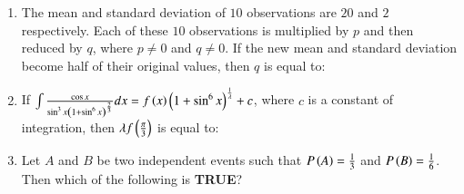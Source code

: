 \documentclass[journal,12pt,onecolumn]{IEEEtran}
\theoremstyle{remark}
\begin{document}
\begin{enumerate}
\item The mean and standard deviation of $10$ observations are $20$ and $2$ respectively. Each of these $10$ observations is multiplied by $p$ and then reduced by $q$, where $p\neq 0$ and $q\neq 0$. If the new mean and standard deviation become half of their original values, then $q$ is equal to:
\begin{enumerate}
\end{enumerate}

\item If $\int \frac{\cos x}{\sin^{3}x\left(1+\sin^{6}x\right)^{\frac{2}{3}}}dx = f\left(x\right)\left(1+\sin^{6}x\right)^{\frac{1}{\lambda}}+c$, where $c$ is a constant of integration, then $\lambda f\left(\frac{\pi}{3}\right)$ is equal to:
\begin{enumerate}
\end{enumerate}

\item Let $A$ and $B$ be two independent events such that $P\left(A\right)=\frac{1}{3}$ and $P\left(B\right)=\frac{1}{6}$. Then which of the following is \textbf{TRUE}?
\begin{enumerate}
\end{enumerate}


\end{enumerate}
\end{document}
